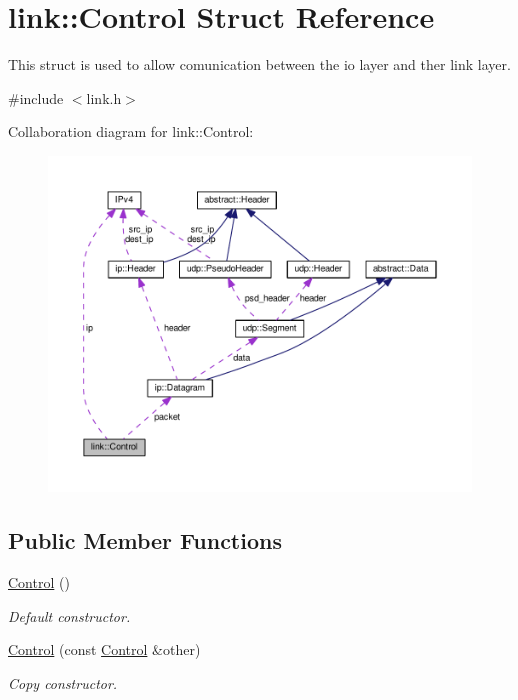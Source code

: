 \hypertarget{structlink_1_1Control}{}\section{link\+:\+:Control Struct Reference}
\label{structlink_1_1Control}


This struct is used to allow comunication between the io layer and ther link layer.  




{\ttfamily \#include $<$link.\+h$>$}



Collaboration diagram for link\+:\+:Control\+:
\nopagebreak
\begin{figure}[H]
\begin{center}
\leavevmode
\includegraphics[width=350pt]{structlink_1_1Control__coll__graph}
\end{center}
\end{figure}
\subsection*{Public Member Functions}
\begin{DoxyCompactItemize}
\item 
\hyperlink{structlink_1_1Control_a516338434f0fb973c8f790e8aba08ec6}{Control} ()
\begin{DoxyCompactList}\small\item\em Default constructor. \end{DoxyCompactList}\item 
\hyperlink{structlink_1_1Control_af69072be879940dcb70c80cc40f2e46a}{Control} (const \hyperlink{structlink_1_1Control}{Control} \&other)
\begin{DoxyCompactList}\small\item\em Copy constructor. \end{DoxyCompactList}\end{DoxyCompactItemize}
